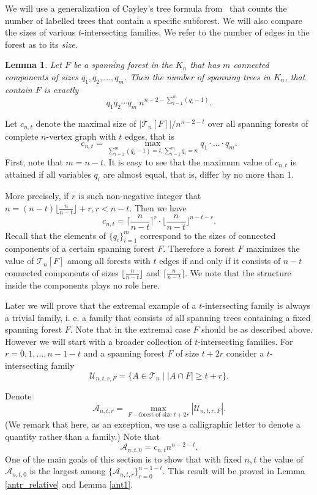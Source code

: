 \documentclass[11pt,letterpaper]{amsart}
\renewcommand{\ge}{\geqslant}
\newcommand{\aaa}{\mathcal{A}}
\newcommand{\uu}{\mathcal U}
\newcommand{\T}{\mathcal{T}}
\newtheorem{lemma}[theorem]{Lemma}
\begin{document}
We will use a generalization of Cayley's tree formula from~\cite[Lemma 6]{tree_counter} that counts the number of labelled trees that contain a specific subforest. We will also compare the sizes of various $t$-intersecting families. We refer to the number of edges in the forest as to its \textit{size}.

\begin{lemma}\label{count_trees}
Let $F$ be a spanning forest in the $K_n$ that has $m$ connected components of sizes $q_1, q_2, \dots, q_m$. Then the number of spanning trees in $K_n$, that contain $F$ is exactly
\[
q_1 q_2 \cdots q_m \ n^{n-2-\sum_{i=1}^m (q_i-1)} .
\]
\end{lemma}

Let $c_{n, t}$ denote the maximal size of $|\T_n[F]|/n^{n-2-t}$ over all spanning forests of complete $n$-vertex graph with $t$ edges, that is $$c_{n, t} = \max_{\sum_{i=1}^m(q_i -1) = t, \sum_{i=1}^{m}q_i = n}q_1\cdot\ldots\cdot q_m.$$ First, note that $m = n-t$. It is easy to see that the maximum value of $c_{n, t}$ is attained if all variables $q_i$ are almost equal, that is, differ by no more than 1.

More precisely, if $r$ is such non-negative integer that $n = (n-t)\lfloor\frac{n}{n-t}\rfloor + r, r < n-t$. Then we have \begin{equation}\label{eqc} c_{n, t} = \Big\lceil\frac{n}{n-t}\Big\rceil^r\cdot\Big\lfloor\frac{n}{n-t}\Big\rfloor^{n-t-r}.\end{equation}
Recall that the elements of $\{q_i\}_{i=1}^m$ correspond to the sizes of connected components of a certain spanning forest $F$. Therefore a forest $F$ maximizes the value of $\T_n[F]$ among all forests with $t$ edges if and only if it consists of $n-t$ connected components of sizes $\lfloor\frac{n}{n-t}\rfloor$ and $\lceil\frac{n}{n-t}\rceil$. We note that the structure inside the components plays no role here.

Later we will prove that the extremal example of a $t$-intersecting family is always a trivial family, i. e. a family that consists of all spanning trees containing a fixed spanning forest $F$. Note that in the extremal case $F$ should be as described above. However we will start with a broader collection of $t$-intersecting families. For $r = 0, 1, \ldots, n - 1 - t$ and a spanning forest $F$ of size $t+2r$ consider a $t$-intersecting family $$\uu_{n, t, r, F} = \{A\in \T_n \mid |A\cap F|\ge t+r\}.$$ 

Denote $$\aaa_{n, t, r} = \max_{F -\text{forest of size } t+2r} |\uu_{n, t, r, F}|.$$ (We remark that here, as an exception, we use a calligraphic letter to denote a quantity rather than a family.) Note that $$\aaa_{n, t, 0} = c_{n, t}n^{n - 2 - t}.$$ One of the main goals of this section is to show that with fixed $n, t$ the value of $\aaa_{n, t, 0}$ is the largest among $\{\aaa_{n, t, r}\}_{r = 0}^{n-1-t}$. This result will be proved in Lemma \ref{antr_relative} and Lemma \ref{ant1}.
\end{document}
